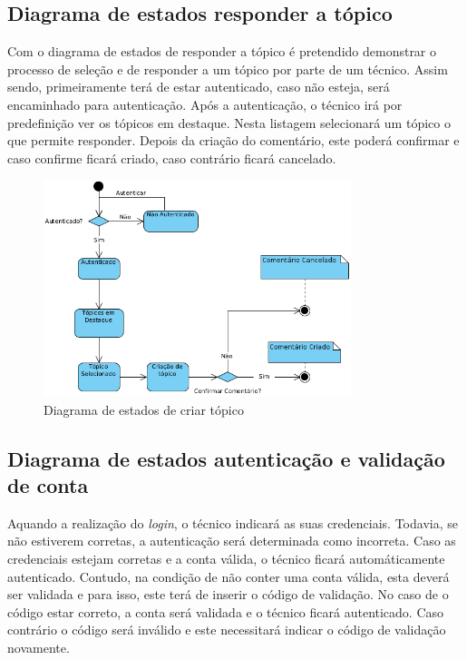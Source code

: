 \newpage

\subsection{Diagrama de estados responder a tópico}

Com o diagrama de estados de responder a tópico é pretendido demonstrar o processo de seleção e de responder a um tópico por parte de um técnico. Assim sendo, primeiramente terá de estar autenticado, caso não esteja, será encaminhado para autenticação. Após a autenticação, o técnico irá por predefinição ver os tópicos em destaque. Nesta listagem selecionará um tópico o que permite responder. Depois da criação do comentário, este poderá confirmar e caso confirme ficará criado, caso contrário ficará cancelado.

\begin{figure}[htb]
  \centering
  \includegraphics[width=0.8\textwidth]{images/diagramas/estados/responder_topico_tecnico.png}
  \caption{Diagrama de estados de criar tópico}
  \label{fig:41}
\end{figure}

\newpage

\subsection{Diagrama de estados autenticação e validação de conta}

Aquando a realização do \textit{login}, o técnico indicará as suas credenciais. Todavia, se não estiverem corretas, a autenticação será determinada como incorreta. Caso as credenciais estejam corretas e a conta válida, o técnico ficará automáticamente autenticado. Contudo, na condição de não conter uma conta válida, esta deverá ser validada e para isso, este terá de inserir o código de validação. No caso de o código estar correto, a conta será validada e o técnico ficará autenticado. Caso contrário o código será inválido e este necessitará indicar o código de validação novamente.

